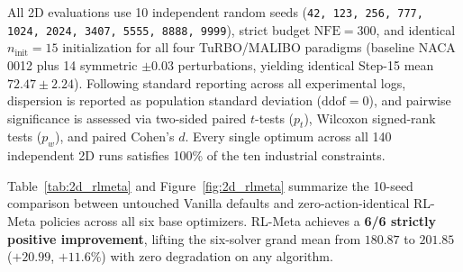 \documentclass[11pt,fleqn,letterpaper]{article}
\begin{document}
All 2D evaluations use 10 independent random seeds (\texttt{42, 123, 256, 777, 1024, 2024, 3407, 5555, 8888, 9999}), strict budget $\text{NFE}=300$, and identical $n_{\text{init}}=15$ initialization for all four TuRBO/MALIBO paradigms (baseline NACA 0012 plus 14 symmetric $\pm 0.03$ perturbations, yielding identical Step-15 mean $72.47 \pm 2.24$). Following standard reporting across all experimental logs, dispersion is reported as population standard deviation ($\text{ddof}=0$), and pairwise significance is assessed via two-sided paired $t$-tests ($p_t$), Wilcoxon signed-rank tests ($p_w$), and paired Cohen's $d$. Every single optimum across all 140 independent 2D runs satisfies 100\% of the ten industrial constraints.

Table~\ref{tab:2d_rlmeta} and Figure~\ref{fig:2d_rlmeta} summarize the 10-seed comparison between untouched Vanilla defaults and zero-action-identical RL-Meta policies across all six base optimizers. RL-Meta achieves a \textbf{6/6 strictly positive improvement}, lifting the six-solver grand mean from $180.87$ to $201.85$ ($+20.99$, $+11.6\%$) with zero degradation on any algorithm.
\end{document}
